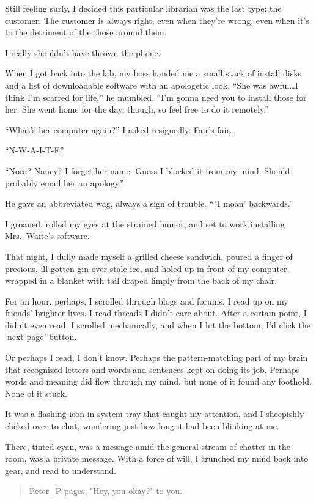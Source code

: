 Still feeling surly, I decided this particular librarian was the last type: the customer. The customer is always right, even when they're wrong, even when it's to the detriment of the those around them.

I really shouldn't have thrown the phone.

When I got back into the lab, my boss handed me a small stack of install disks and a list of downloadable software with an apologetic look. ``She was awful\ldots{}I think I'm scarred for life,'' he mumbled. ``I'm gonna need you to install those for her. She went home for the day, though, so feel free to do it remotely.''

``What's her computer again?'' I asked resignedly. Fair's fair.

``N-W-A-I-T-E''

``Nora? Nancy? I forget her name. Guess I blocked it from my mind. Should probably email her an apology.''

He gave an abbreviated wag, always a sign of trouble. ``\,`I moan' backwards.''

I groaned, rolled my eyes at the strained humor, and set to work installing Mrs.~Waite's software.

That night, I dully made myself a grilled cheese sandwich, poured a finger of precious, ill-gotten gin over stale ice, and holed up in front of my computer, wrapped in a blanket with tail draped limply from the back of my chair.

For an hour, perhaps, I scrolled through blogs and forums. I read up on my friends' brighter lives. I read threads I didn't care about. After a certain point, I didn't even read. I scrolled mechanically, and when I hit the bottom, I'd click the `next page' button.

Or perhaps I read, I don't know. Perhaps the pattern-matching part of my brain that recognized letters and words and sentences kept on doing its job. Perhaps words and meaning did flow through my mind, but none of it found any foothold. None of it stuck.

It was a flashing icon in system tray that caught my attention, and I sheepishly clicked over to chat, wondering just how long it had been blinking at me.

There, tinted cyan, was a message amid the general stream of chatter in the room, was a private message. With a force of will, I crunched my mind back into gear, and read to understand.

\begin{verse}
    {\MUCKFamily
Peter\_P pages, "Hey, you okay?" to you.}
\end{verse}

